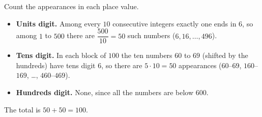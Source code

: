 Count the appearances in each place value.
\begin{itemize}
\item \textbf{Units digit.} Among every $10$ consecutive integers exactly one ends in $6$, so among $1$ to $500$ there are $\dfrac{500}{10}=50$ such numbers ($6,16,\dots,496$).
\item \textbf{Tens digit.} In each block of $100$ the ten numbers $60$ to $69$ (shifted by the hundreds) have tens digit $6$, so there are $5\cdot10=50$ appearances ($60$--$69$, $160$--$169$, \dots, $460$--$469$).
\item \textbf{Hundreds digit.} None, since all the numbers are below $600$.
\end{itemize}
The total is $50+50=\boxed{100}$.

